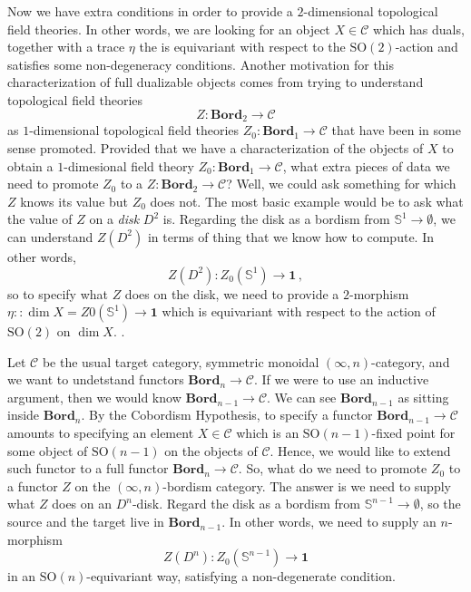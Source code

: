 \documentclass[a4paper,11pt]{article}
\newcommand{\ccal}{\mathcal{C}}
\theoremstyle{plain}
\theoremstyle{definition}
\theoremstyle{remark}
\begin{document}
Now we have extra conditions in order to provide a $2$-dimensional topological field theories. In other words, we are looking for an object $X \in \ccal$ which has duals, together with a trace $\eta$ the is equivariant with respect to the $\text{SO}(2)$-action and satisfies some non-degeneracy conditions. Another motivation for this characterization of full dualizable objects comes from trying to understand topological field theories 
$$Z \colon \textbf{Bord}_2 \to \ccal$$
as $1$-dimensional topological field theories $Z_0 \colon \textbf{Bord}_1 \to \ccal$ that have been in some sense promoted. Provided that we have a characterization of the objects of $X$ to obtain a $1$-dimesional field theory $Z_0 \colon \textbf{Bord}_1 \to \ccal$, what extra pieces of data we need to promote $Z_0$ to a  $Z \colon \textbf{Bord}_2 \to \ccal$? Well, we could ask something for which $Z$ knows its value but $Z_0$ does not. The most basic example would be to ask what the value of $Z$ on a \textit{disk} $D^2$ is. Regarding the disk as a bordism from $\mathbb{S}^1 \to \emptyset$, we can understand $Z(D^2)$ in terms of thing that we know how to compute. In other words, 
$$Z(D^2) \colon Z_0(\mathbb{S}^1) \to \mathbf{1}\, ,$$
so to specify what $Z$ does on the disk, we need to provide a $2$-morphism $\eta :\colon \dim X = Z0(\mathbb{S}^1) \to \mathbf{1}$ which is equivariant with respect to the action of $\text{SO}(2)$ on $\dim X$. .  







Let $\ccal$ be the usual target category, symmetric monoidal $(\infty, n)$-category, and we want to undetstand functors $\textbf{Bord}_n \to \ccal$. If we were to use an inductive argument, then we would know $\textbf{Bord}_{n-1} \to \ccal$. We can see $\textbf{Bord}_{n-1}$ as sitting inside $\textbf{Bord}_n$. By the Cobordism Hypothesis, to specify a functor $\textbf{Bord}_{n-1} \to \ccal$ amounts to specifying an element $X \in \ccal$ which is an $\text{SO}(n-1)$-fixed point for some object of $\text{SO}(n-1)$ on the objects of $\ccal$. Hence, we would like to extend such functor to a full functor $\textbf{Bord}_n \to \ccal$. So, what do we need to promote $Z_0$ to a functor $Z$ on the $(\infty, n)$-bordism category. The answer is we need to supply what $Z$ does on an $D^n$-disk. Regard the disk as a bordism from $\mathbb{S}^{n-1} \to \emptyset$, so the source and the target live in $\textbf{Bord}_{n-1}$. In other words, we need to supply an $n$-morphism
$$Z(D^n) \colon Z_0(\mathbb{S}^{n-1}) \to \mathbf{1}$$
in an $\text{SO}(n)$-equivariant way, satisfying a non-degenerate condition. 
\end{document}
